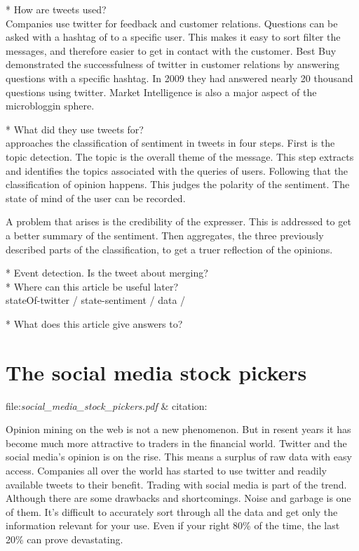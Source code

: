 * How are tweets used?\\
Companies use twitter for feedback and customer relations. Questions can be
asked with a hashtag of to a specific user. This makes it easy to sort filter
the messages, and therefore easier to get in contact with the customer. Best
Buy demonstrated the successfulness of twitter in customer relations by
answering questions with a specific hashtag. In 2009 they had answered nearly
20 thousand questions using twitter. \cite[p1]{Li2013206}
Market Intelligence is also a major aspect of the microbloggin sphere. 

* What did they use tweets for?\\
\cite[]{Li2013206} approaches the classification of sentiment in tweets in four
steps. First is the topic detection. The topic is the overall theme of the
message. This step extracts and identifies the topics associated with the
queries of users. Following that the classification of opinion happens. This
judges the polarity of the sentiment. The state of mind of the user can be
recorded. 

A problem that arises is the credibility of the expresser. This is addressed to
get a better summary of the sentiment. Then \cite[]{Li2013206} aggregates, the
three previously described parts of the classification, to get a truer
reflection of the opinions. 


* Event detection. Is the tweet about merging? \\
* Where can this article be useful later? \\
stateOf-twitter / state-sentiment /  data / 

* What does this article give answers to?\\

\section{The social media stock pickers}
file:\textit{social\_media\_stock\_pickers.pdf} & citation:\cite[]{stevenson12:social_media_stock_pickers}

Opinion mining on the web is not a new phenomenon. But in resent years it has
become much more attractive to traders in the financial world. Twitter and the
social media's opinion is on the rise. This means a surplus of raw data with
easy access. Companies all over the world has started to use twitter and
readily available tweets to their benefit. Trading with social media is part of
the trend. Although there are some drawbacks and shortcomings. Noise and
garbage is one of them. It's difficult to accurately sort through all the data
and get only the information relevant for your use. Even if your right 80\% of
the time, the last 20\% can prove devastating. \cite[]{stevenson12:social_media_stock_pickers}

